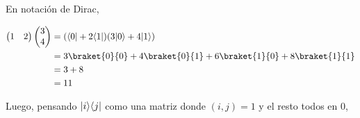 \documentclass[osajnl,preprint,showpacs,superscriptaddress,10pt]{revtex4-1} %
\DeclarePairedDelimiter\bra{\langle}{\rvert}
\DeclarePairedDelimiter\ket{\lvert}{\rangle}
\begin{document}
\begin{itemize}
    En notación de Dirac,
    \begin{fleqn}[\parindent]
    \begin{equation}
    \begin{split}
        \begin{pmatrix}1 & 2\end{pmatrix}\begin{pmatrix}3 \\ 4\end{pmatrix}
            &= (\bra{0} + 2\bra{1})(3\ket{0} + 4\ket{1}) \\
            &= 3\braket{0}{0} + 4\braket{0}{1} + 6\braket{1}{0} + 8\braket{1}{1} \\
            &= 3 + 8 \\
            &= 11
    \end{split}
    \end{equation}
    \end{fleqn}
\end{itemize}

Luego, pensando $\ket{i}\bra{j}$ como una matriz donde $(i, j) = 1$ y el resto todos en 0,
\end{document}
